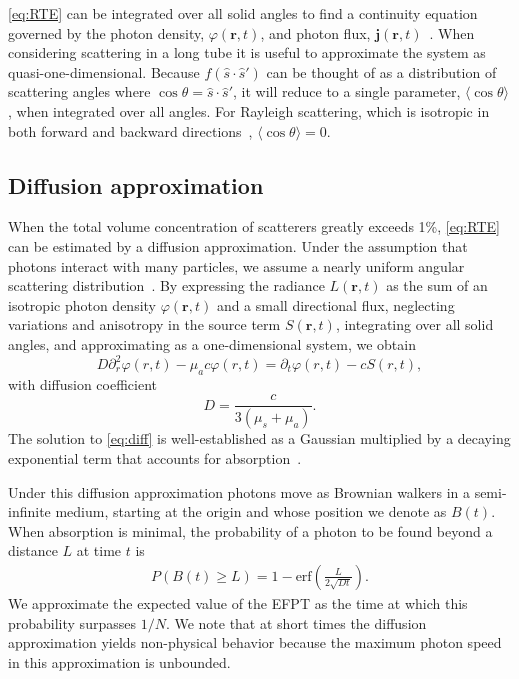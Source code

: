 \eqref{eq:RTE} can be integrated over all solid angles to find a continuity equation governed by the photon density, $\varphi\left(\mathbf{r}, t\right)$, and photon flux, $\mathbf{j}\left(\mathbf{r}, t\right)$~\cite{haskell_boundary_1994}. When considering scattering in a long tube it is useful to approximate the system as quasi-one-dimensional.  Because $f\left(\hat{s}\cdot\hat{s}'\right)$ can be thought of as a distribution of scattering angles where $\cos \theta = \hat s \cdot \hat s'$, it will reduce to a single parameter, $\langle\cos{\theta}\rangle$, when integrated over all angles. For Rayleigh scattering, which is isotropic in both forward and backward directions~\cite{bohren_absorption_1983}, $\langle\cos{\theta}\rangle = 0$.

\subsection{Diffusion approximation}\label{sec:diffusion}
When the total volume concentration of scatterers greatly exceeds 1\%, \eqref{eq:RTE} can be estimated by a diffusion approximation. Under the assumption that photons interact with many particles, we assume a nearly uniform angular scattering distribution~\cite{ishimaru_wave_1997,bohren_absorption_1983}. By expressing the radiance $L\left(\mathbf{r},t\right)$ as the sum of an isotropic photon density $\varphi\left(\mathbf{r}, t\right)$ and a small directional flux, neglecting variations and anisotropy in the source term $S\left(\mathbf{r},t\right)$, integrating over all solid angles, and approximating as a one-dimensional system, we obtain~\cite{haskell_boundary_1994}
%
\begin{equation}\label{eq:diff}
    D \partial_{r}^{2} \varphi \left(r,t\right) - \mu_{a} c \varphi \left(r,t\right) = \partial_{t} \varphi \left(r,t\right) - c S \left(r,t\right),
\end{equation}
%
with diffusion coefficient
\begin{equation}\label{eq:diffD}
    D = \frac{c}{3\left(\mu_{s} + \mu_{a}\right)}.
\end{equation}
The solution to \eqref{eq:diff} is well-established as a Gaussian multiplied by a decaying exponential term that accounts for absorption~\cite{haskell_boundary_1994}.

Under this diffusion approximation photons move as Brownian walkers in a semi-infinite medium, starting at the origin and whose position we denote as $B(t)$. When absorption is minimal, the probability of a photon to be found beyond a distance $L$ at time $t$ is~\cite{redner_guide_2001,lawley_distribution_2020}
\begin{align}\label{eq:diffProb}
     P\left(B\left(t\right) \geq L\right) = 1-\textrm{erf}\left(\frac{L}{2 \sqrt{D t}}\right).
\end{align}
We approximate the expected value of the EFPT as the time at which this probability surpasses $1/N$. We note that at short times the diffusion approximation yields non-physical behavior because the maximum photon speed in this approximation is unbounded.


